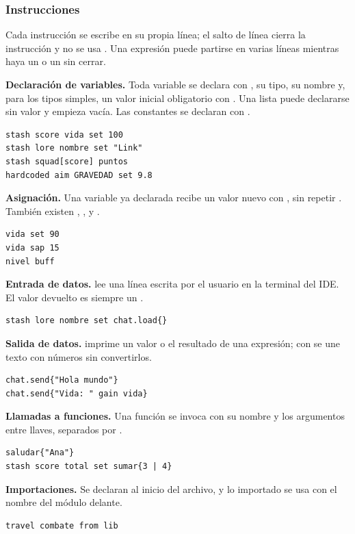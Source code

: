 \subsubsection{Instrucciones}

Cada instrucción se escribe en su propia línea; el salto de línea cierra la instrucción y no se usa \kw{;}. Una expresión puede partirse en varias líneas mientras haya un \kw{\{} o un \kw{<} sin cerrar.

\textbf{Declaración de variables.} Toda variable se declara con , su tipo, su nombre y, para los tipos simples, un valor inicial obligatorio con . Una lista puede declararse sin valor y empieza vacía. Las constantes se declaran con .
\begin{lstlisting}
stash score vida set 100
stash lore nombre set "Link"
stash squad[score] puntos
hardcoded aim GRAVEDAD set 9.8
\end{lstlisting}

\textbf{Asignación.} Una variable ya declarada recibe un valor nuevo con , sin repetir . También existen , ,  y .
\begin{lstlisting}
vida set 90
vida sap 15
nivel buff
\end{lstlisting}

\textbf{Entrada de datos.}  lee una línea escrita por el usuario en la terminal del IDE. El valor devuelto es siempre un .
\begin{lstlisting}
stash lore nombre set chat.load{}
\end{lstlisting}

\textbf{Salida de datos.}  imprime un valor o el resultado de una expresión; con  se une texto con números sin convertirlos.
\begin{lstlisting}
chat.send{"Hola mundo"}
chat.send{"Vida: " gain vida}
\end{lstlisting}

\textbf{Llamadas a funciones.} Una función se invoca con su nombre y los argumentos entre llaves, separados por \kw{|}.
\begin{lstlisting}
saludar{"Ana"}
stash score total set sumar{3 | 4}
\end{lstlisting}

\textbf{Importaciones.} Se declaran al inicio del archivo, y lo importado se usa con el nombre del módulo delante.
\begin{lstlisting}
travel combate from lib
\end{lstlisting}

